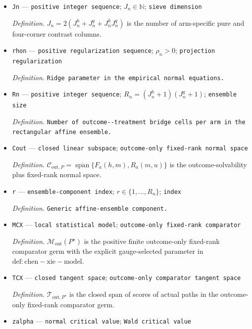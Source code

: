 \documentclass{article}
\begin{document}
\begin{itemize}
  \item \texttt{Jn} --- \texttt{positive integer sequence}; \(J_n\in\mathbb N\); \texttt{sieve dimension}
  \par\smallskip\noindent\emph{Definition.} \(J_n=2(J_n^h+J_n^q+J_n^hJ_n^q)\) is the number of arm-specific pure and four-corner contrast columns.
  \item \texttt{rhon} --- \texttt{positive regularization sequence}; \(\rho_n>0\); \texttt{projection regularization}
  \par\smallskip\noindent\emph{Definition.} \texttt{Ridge parameter in the empirical normal equations.}
  \item \texttt{Rn} --- \texttt{positive integer sequence}; \(R_n=(J_n^h+1)(J_n^q+1)\); \texttt{ensemble size}
  \par\smallskip\noindent\emph{Definition.} \texttt{Number of outcome-\allowbreak{}-\allowbreak{}treatment bridge cells per arm in the rectangular affine ensemble.}
  \item \texttt{Cout} --- \texttt{closed linear subspace}; \texttt{outcome-\allowbreak{}only fixed-\allowbreak{}rank normal space}
  \par\smallskip\noindent\emph{Definition.} \(\mathcal C_{\mathrm{out},P}=\overline{\operatorname{span}}\{F_a(h,m),R_a(m,u)\}\) is the outcome-solvability plus fixed-rank normal space.
  \item \texttt{r} --- \texttt{ensemble-\allowbreak{}component index}; \(r\in\{1,\ldots,R_n\}\); \texttt{index}
  \par\smallskip\noindent\emph{Definition.} \texttt{Generic affine-\allowbreak{}ensemble component.}
  \item \texttt{MCX} --- \texttt{local statistical model}; \texttt{outcome-\allowbreak{}only fixed-\allowbreak{}rank comparator}
  \par\smallskip\noindent\emph{Definition.} \(\mathcal M_{\mathrm{out}}(P^\star)\) is the positive finite outcome-only fixed-rank comparator germ with the explicit gauge-selected parameter in \(\mathrm{def:chen-xie-model}\).
  \item \texttt{TCX} --- \texttt{closed tangent space}; \texttt{outcome-\allowbreak{}only comparator tangent space}
  \par\smallskip\noindent\emph{Definition.} \(\mathcal T_{\mathrm{out},P^\star}\) is the closed span of scores of actual paths in the outcome-only fixed-rank comparator germ.
  \item \texttt{zalpha} --- \texttt{normal critical value}; \texttt{Wald critical value}

\end{itemize}
\end{document}
